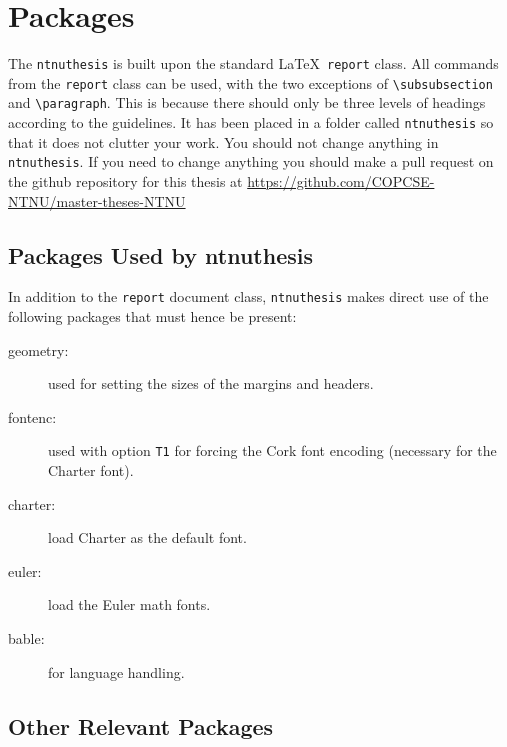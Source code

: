 \chapter{Packages}
\label{chap:packages}

The \texttt{ntnuthesis} is built upon the standard \LaTeX\
\texttt{report} class. All commands from the \texttt{report} class can
be used, with the two exceptions of \verb+\subsubsection+ and
\verb+\paragraph+. This is because there should only be three
levels of headings according to the guidelines. 
It has been placed in a folder called \texttt{ntnuthesis} so that it does not
clutter your work.  You should not change anything in \texttt{ntnuthesis}. If you need to change 
anything you should make a pull request on the github repository for this thesis at
\url{https://github.com/COPCSE-NTNU/master-theses-NTNU}

\section{Packages Used by ntnuthesis}
\label{sec:packages}

In addition to the \texttt{report} document class,
\texttt{ntnuthesis} makes direct use of the following packages
that must hence be present:
\begin{description}
	\item[geometry:] used for setting the sizes of the margins and
  	headers.
	\item[fontenc:] used with option \texttt{T1} for forcing the Cork font
  	encoding (necessary for the Charter font).
	\item[charter:] load Charter as the default font.
	\item[euler:] load the Euler math fonts.
	\item[bable:] for language handling.
\end{description}

\section{Other Relevant Packages}
\label{sec:otherpackages}

